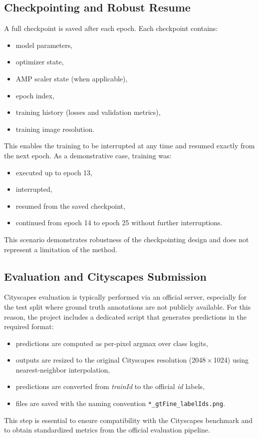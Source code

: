 \documentclass[conference]{IEEEtran}
\begin{document}
\subsection{Checkpointing and Robust Resume}
A full checkpoint is saved after each epoch. Each checkpoint contains:
\begin{itemize}
\item model parameters,
\item optimizer state,
\item AMP scaler state (when applicable),
\item epoch index,
\item training history (losses and validation metrics),
\item training image resolution.
\end{itemize}

This enables the training to be interrupted at any time and resumed exactly from the next epoch. As a demonstrative case, training was:
\begin{itemize}
\item executed up to epoch 13,
\item interrupted,
\item resumed from the saved checkpoint,
\item continued from epoch 14 to epoch 25 without further interruptions.
\end{itemize}
This scenario demonstrates robustness of the checkpointing design and does not represent a limitation of the method.

\subsection{Evaluation and Cityscapes Submission}
Cityscapes evaluation is typically performed via an official server, especially for the test split where ground truth annotations are not publicly available. For this reason, the project includes a dedicated script that generates predictions in the required format:
\begin{itemize}
\item predictions are computed as per-pixel argmax over class logits,
\item outputs are resized to the original Cityscapes resolution (2048\,$\times$\,1024) using nearest-neighbor interpolation,
\item predictions are converted from \textit{trainId} to the official \textit{id} labels,
\item files are saved with the naming convention \texttt{*\_gtFine\_labelIds.png}.
\end{itemize}
This step is essential to ensure compatibility with the Cityscapes benchmark and to obtain standardized metrics from the official evaluation pipeline.
\end{document}
